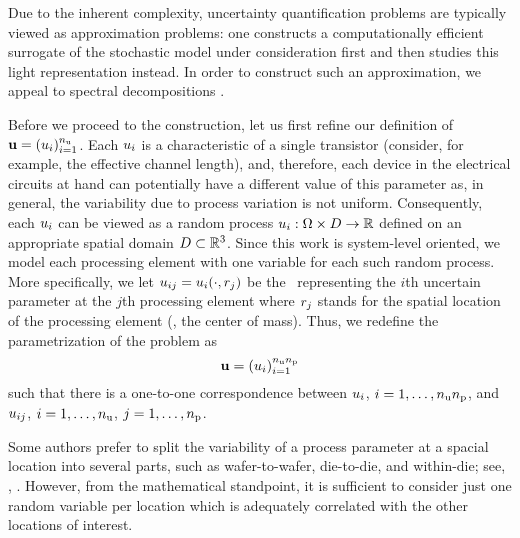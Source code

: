 Due to the inherent complexity, uncertainty quantification problems are typically viewed as approximation problems: one constructs a computationally efficient surrogate of the stochastic model under consideration first and then studies this light representation instead.
In order to construct such an approximation, we appeal to spectral decompositions \cite{maitre2010, janson1997, eldred2008}.

Before we proceed to the construction, let us first refine our definition of $\mathbf{u} = (u_i)_{i = 1}^{n_\text{u}}$.
Each $u_i$ is a characteristic of a single transistor (consider, for example, the effective channel length), and, therefore, each device in the electrical circuits at hand can potentially have a different value of this parameter as, in general, the variability due to process variation is not uniform.
Consequently, each $u_i$ can be viewed as a random process $u_i: \Omega \times D \to \mathbb{R}$ defined on an appropriate spatial domain $D \subset \mathbb{R}^3$.
Since this work is system-level oriented, we model each processing element with one variable for each such random process.
More specifically, we let $u_{ij} = u_i(\cdot, r_j)$ be the \rv\ representing the $i$th uncertain parameter at the $j$th processing element where $r_j$ stands for the spatial location of the processing element (\eg, the center of mass).
Thus, we redefine the parametrization of the problem as
\begin{equation} \elab{uncertain-parameters}
  \vu = (\u_i)_{i = 1}^{\nparams \nprocs}
\end{equation}
such that there is a one-to-one correspondence between $u_i$, $i = 1, \dots, {n_\text{u}} {n_\text{p}}$, and $u_{ij}$, $i = 1, \dots, {n_\text{u}}$, $j = 1, \dots, {n_\text{p}}$.
\begin{remark}
Some authors prefer to split the variability of a process parameter at a spacial location into several parts, such as wafer-to-wafer, die-to-die, and within-die; see, \eg, \cite{juan2012}.
However, from the mathematical standpoint, it is sufficient to consider just one random variable per location which is adequately correlated with the other locations of interest.
\end{remark}

